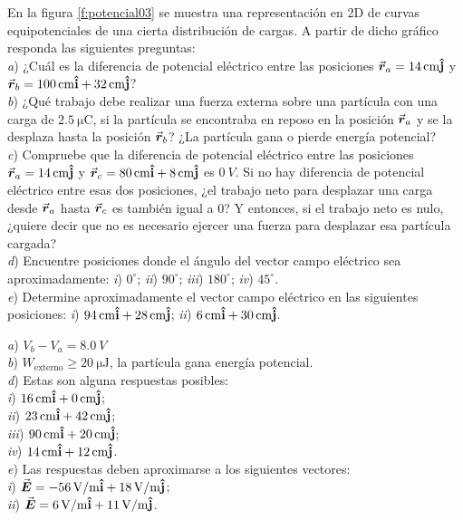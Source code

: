 %
\begin{Exercise}\label{p:potencial03}
  En la figura \ref{f:potencial03} se muestra una representación en 2D de curvas equipotenciales de una cierta distribución de cargas. A partir de dicho gráfico responda las siguientes preguntas:\\
  \textit{a}) ¿Cuál es la diferencia de potencial eléctrico entre las posiciones $\va*{r}_a = \SI{14}{cm}\vu{j}$ y $\va*{r}_b = \SI{100}{cm}\vu{i} + \SI{32}{cm}\vu{j}$?\\
  \textit{b}) ¿Qué trabajo debe realizar una fuerza externa sobre una partícula con una carga de $\SI{2.5}{\micro\coulomb}$, si la partícula se encontraba en reposo en la posición $\va*{r}_a$ y se la desplaza hasta la posición $\va*{r}_b$? ¿La partícula gana o pierde energía potencial?\\
  \textit{c}) Compruebe que la diferencia de potencial eléctrico entre las posiciones $\va*{r}_a = \SI{14}{cm}\vu{j}$ y $\va*{r}_c = \SI{80}{cm}\vu{i} + \SI{8}{cm}\vu{j}$ es $\SI{0}{V}$. Si no hay diferencia de potencial eléctrico entre esas dos posiciones, ¿el trabajo neto para desplazar una carga desde $\va*{r}_a$ hasta $\va*{r}_c$ es también igual a $0$? Y entonces, si el trabajo neto es nulo, ¿quiere decir que no es necesario ejercer una fuerza para desplazar esa partícula cargada?\\
  \textit{d}) Encuentre posiciones donde el ángulo del vector campo eléctrico sea aproximadamente: \textit{i}) $0^\circ$; \textit{ii}) $90^\circ$; \textit{iii}) $180^\circ$; \textit{iv}) $45^\circ$.\\
  \textit{e}) Determine aproximadamente el vector campo eléctrico en las siguientes posiciones: \textit{i}) $\SI{94}{cm}\vu{i} + \SI{28}{cm}\vu{j}$; \textit{ii}) $\SI{6}{cm}\vu{i} + \SI{30}{cm}\vu{j}$.
\end{Exercise}
\begin{Answer}
	\begin{minipage}[t]{.4\textwidth}
    \textit{a}) $V_b-V_a = \SI{8.0}{V}$\\
    \textit{b}) $W_\text{externo} \geq \SI{20}{\micro\joule}$, la partícula gana energía potencial.\\
    \textit{d}) Estas son alguna respuestas posibles:\\
    \textit{i}) $\SI{16}{cm}\vu{i} + \SI{0}{cm}\vu{j}$;\\
    \textit{ii}) $\SI{23}{cm}\vu{i} + \SI{42}{cm}\vu{j}$;\\
    \textit{iii}) $\SI{90}{cm}\vu{i} + \SI{20}{cm}\vu{j}$;\\
    \textit{iv}) $\SI{14}{cm}\vu{i} + \SI{12}{cm}\vu{j}$.\\
    \textit{e}) Las respuestas deben aproximarse a los siguientes vectores:\\
    \textit{i}) $\va*{E} = \SI{-56}{V/m}\vu{i} +\SI{18}{V/m}\vu{j}$;\\
    \textit{ii}) $\va*{E} = \SI{6}{V/m}\vu{i} +\SI{11}{V/m}\vu{j}$.
  \end{minipage}
\end{Answer}

